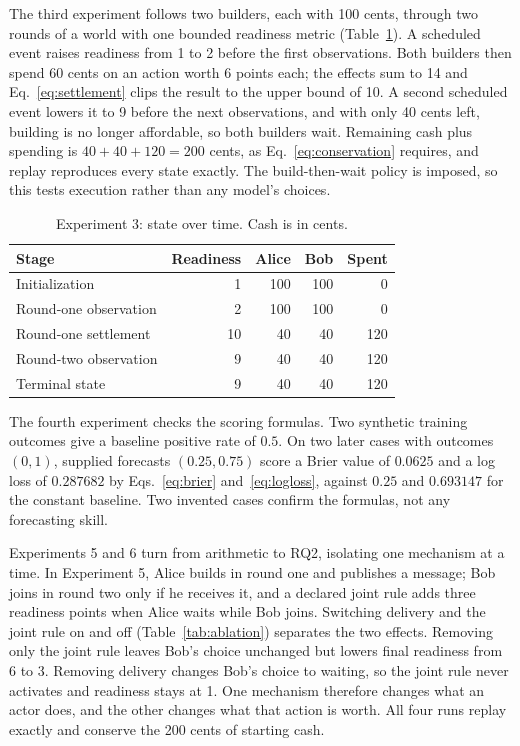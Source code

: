 The third experiment follows two builders, each with 100 cents, through two
rounds of a world with one bounded readiness metric
(Table~\ref{tab:timing}). A scheduled event raises readiness from 1 to 2
before the first observations. Both builders then spend 60 cents on an
action worth 6 points each; the effects sum to 14 and Eq.~\eqref{eq:settlement}
clips the result to the upper bound of 10. A second scheduled event lowers it
to 9 before the next observations, and with only 40 cents left, building is
no longer affordable, so both builders wait. Remaining cash plus spending is
$40+40+120=200$ cents, as Eq.~\eqref{eq:conservation} requires, and replay
reproduces every state exactly. The build-then-wait policy is imposed, so
this tests execution rather than any model's choices.

\begin{table}[t]
\caption{Experiment 3: state over time. Cash is in cents.}
\label{tab:timing}
\centering\footnotesize
\begin{tabular}{@{}lrrrr@{}}
\toprule Stage & Readiness & Alice & Bob & Spent \\
\midrule
Initialization & 1 & 100 & 100 & 0 \\
Round-one observation & 2 & 100 & 100 & 0 \\
Round-one settlement & 10 & 40 & 40 & 120 \\
Round-two observation & 9 & 40 & 40 & 120 \\
Terminal state & 9 & 40 & 40 & 120 \\
\bottomrule
\end{tabular}
\end{table}

The fourth experiment checks the scoring formulas. Two synthetic training
outcomes give a baseline positive rate of $0.5$. On two later cases with
outcomes $(0,1)$, supplied forecasts $(0.25,0.75)$ score a Brier value of
$0.0625$ and a log loss of $0.287682$ by Eqs.~\eqref{eq:brier}
and~\eqref{eq:logloss}, against $0.25$ and $0.693147$ for the constant
baseline. Two invented cases confirm the formulas, not any forecasting
skill.

Experiments 5 and 6 turn from arithmetic to RQ2, isolating one mechanism at a
time. In Experiment 5, Alice builds in round one and publishes a message; Bob
joins in round two only if he receives it, and a declared joint rule adds
three readiness points when Alice waits while Bob joins. Switching delivery
and the joint rule on and off (Table~\ref{tab:ablation}) separates the two
effects. Removing only the joint rule leaves Bob's choice unchanged but lowers
final readiness from 6 to 3. Removing delivery changes Bob's choice to waiting,
so the joint rule never activates and readiness stays at 1. One mechanism
therefore changes what an actor does, and the other changes what that
action is worth. All four runs replay exactly and conserve the 200 cents of
starting cash.

